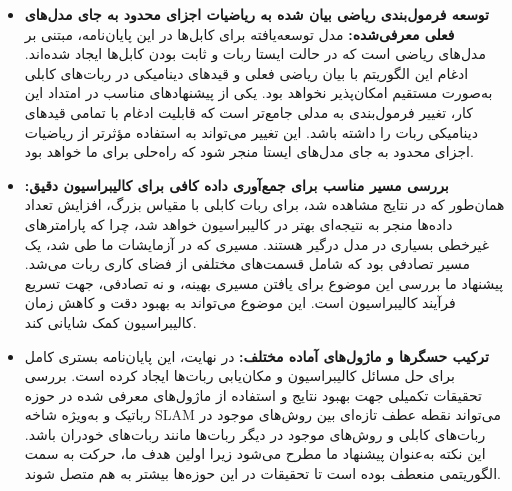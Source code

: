 \begin{itemize}
\item \textbf{توسعه فرمول‌بندی ریاضی بیان شده به ریاضیات اجزای محدود به جای مدل‌های فعلی معرفی‌شده:}
مدل توسعه‌یافته برای کابل‌ها در این پایان‌نامه، مبتنی بر مدل‌های ریاضی است که در حالت ایستا ربات و ثابت بودن کابل‌ها ایجاد شده‌اند. ادغام این الگوریتم با بیان ریاضی فعلی و قیدهای دینامیکی در ربات‌های کابلی به‌صورت مستقیم امکان‌پذیر نخواهد بود. یکی از پیشنهادهای مناسب در امتداد این کار، تغییر فرمول‌بندی به مدلی جامع‌تر است که قابلیت ادغام با تمامی قیدهای دینامیکی ربات را داشته باشد. این تغییر می‌تواند به استفاده مؤثرتر از ریاضیات اجزای محدود به جای مدل‌های ایستا منجر شود که راه‌حلی برای ما خواهد بود.

\item \textbf{بررسی مسیر مناسب برای جمع‌آوری داده کافی برای کالیبراسیون دقیق:}
همان‌طور که در نتایج مشاهده شد، برای ربات کابلی با مقیاس بزرگ، افزایش تعداد داده‌ها منجر به نتیجه‌ای بهتر در کالیبراسیون خواهد شد، چرا که پارامترهای غیرخطی بسیاری در مدل درگیر هستند. مسیری که در آزمایشات ما طی شد، یک مسیر تصادفی بود که شامل قسمت‌های مختلفی از فضای کاری ربات می‌شد. پیشنهاد ما بررسی این موضوع برای یافتن مسیری بهینه، و نه تصادفی، جهت تسریع فرآیند کالیبراسیون است. این موضوع می‌تواند به بهبود دقت و کاهش زمان کالیبراسیون کمک شایانی کند.


\item \textbf{ترکیب حسگر‌ها و ماژول‌های آماده مختلف:}
در نهایت، این پایان‌نامه بستری کامل برای حل مسائل کالیبراسیون و مکان‌یابی ربات‌ها ایجاد کرده است. بررسی تحقیقات تکمیلی جهت بهبود نتایج و استفاده از ماژول‌های معرفی شده در حوزه رباتیک و به‌ویژه شاخه SLAM می‌تواند نقطه عطف تازه‌ای بین روش‌های موجود در ربات‌های کابلی و روش‌های موجود در دیگر ربات‌ها مانند ربات‌های خودران باشد. این نکته به‌عنوان پیشنهاد ما مطرح می‌شود زیرا اولین هدف ما، حرکت به سمت الگوریتمی منعطف بوده است تا تحقیقات در این حوزه‌ها بیشتر به هم متصل شوند.


\end{itemize}
